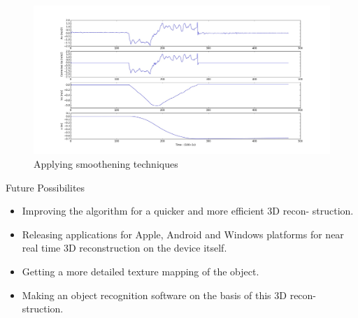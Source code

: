 \documentclass{beamer}
\begin{document}
\begin{frame}{}{}
  \begin{figure}[ht!]
    \centering
    \includegraphics[width=\linewidth]{Corrected.jpeg}
    \caption{Applying smoothening techniques}
  \end{figure}
  \note{\textcolor{red}{Kartikeya\\}}
\end{frame}



\begin{frame}{Future Possibilites}{}
    \begin{itemize}
      \item Improving the algorithm for a quicker and more efficient 3D recon-
struction.
      \item Releasing applications for Apple, Android and Windows platforms
for near real time 3D reconstruction on the device itself.
      \item Getting a more detailed texture mapping of the object.
      \item Making an object recognition software on the basis of this 3D recon-
struction.
    \end{itemize}
    \note{\textcolor{red}{Kartikeya\\}}
    \note{\textcolor{green}{Prateej\\}}
\end{frame}
\end{document}
